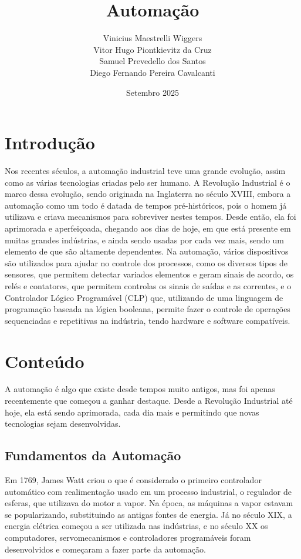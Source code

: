 \documentclass{article}
\title{Automação}
\author{%
	Vinicius Maestrelli Wiggers\\[0.5em]
	Vitor Hugo Piontkievitz da Cruz\\[0.5em]
	Samuel Prevedello dos Santos\\[0.5em]
	Diego Fernando Pereira Cavalcanti
}
\date{Setembro 2025}
\begin{document}
\maketitle

\section{Introdução}

Nos recentes séculos, a automação industrial teve uma grande evolução, assim como as várias tecnologias criadas pelo ser humano. A Revolução Industrial é o marco dessa evolução, sendo originada na Inglaterra no século XVIII, embora a automação como um todo é datada de tempos pré-históricos, pois o homem já utilizava e criava mecanismos para sobreviver nestes tempos. Desde então, ela foi aprimorada e aperfeiçoada, chegando aos dias de hoje, em que está presente em muitas grandes indústrias, e ainda sendo usadas por cada vez mais, sendo um elemento de que são altamente dependentes. Na automação, vários dispositivos são utilizados para ajudar no controle dos processos, como os diversos tipos de sensores, que permitem detectar variados elementos e geram sinais de acordo, os relés e contatores, que permitem controlas os sinais de saídas e as correntes, e o Controlador Lógico Programável (CLP) que, utilizando de uma linguagem de programação baseada na lógica booleana, permite fazer o controle de operações sequenciadas e repetitivas na indústria, tendo hardware e software compatíveis.  

\section{Conteúdo}

A automação é algo que existe desde tempos muito antigos, mas foi apenas recentemente que começou a ganhar destaque. Desde a Revolução Industrial até hoje, ela está sendo aprimorada, cada dia mais e permitindo que novas tecnologias sejam desenvolvidas.

\subsection{Fundamentos da Automação}

Em 1769, James Watt criou o que é considerado o primeiro controlador automático com realimentação usado em um processo industrial, o regulador de esferas, que utilizava do motor a vapor. Na época, as máquinas a vapor estavam se popularizando, substituindo as antigas fontes de energia. Já no século XIX, a energia elétrica começou a ser utilizada nas indústrias, e no século XX os computadores, servomecanismos e controladores programáveis foram desenvolvidos e começaram a fazer parte da automação. 
\end{document}
